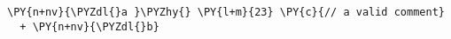 \begin{Verbatim}[commandchars=\\\{\}]
\PY{n+nv}{\PYZdl{}a }\PYZhy{} \PY{l+m}{23} \PY{c}{// a valid comment}
  + \PY{n+nv}{\PYZdl{}b}
\end{Verbatim}
